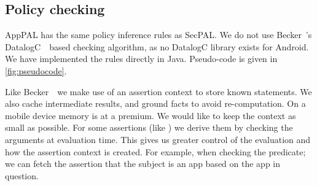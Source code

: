 \documentclass[]{llncs}
\begin{document}
%
%

\subsection{Policy checking}
\label{ssec:eval}

AppPAL has the same policy inference rules as SecPAL.
We do not use Becker~\etal's DatalogC~\cite{Li:2003ix}~based checking algorithm, as no DatalogC library exists for Android.
We have implemented the rules directly in Java.
Pseudo-code is given in \autoref{fig:pseudocode}.

Like Becker~\etal~we make use of an assertion context to store known statements.
We also cache intermediate results, and ground facts to avoid re-computation.
On a mobile device memory is at a premium.
We would like to keep the context as small as possible.
For some assertions (like ) we derive them by checking the arguments at evaluation time.
This gives us greater control of the evaluation and how the assertion context is created.
For example, when checking the  predicate;
  we can fetch the assertion that the subject is an app based on the app in question.
\end{document}
